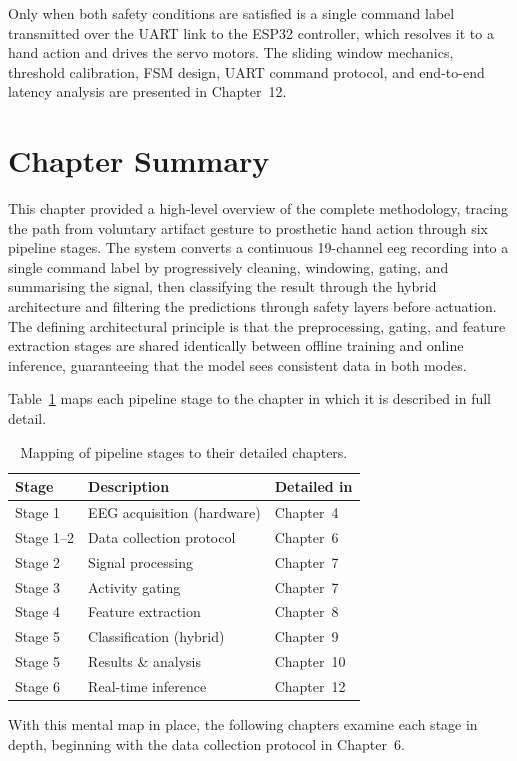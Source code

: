 Only when both safety conditions are satisfied is a single command
label transmitted over the UART link to the ESP32 controller, which
resolves it to a hand action and drives the servo motors. The sliding
window mechanics, threshold calibration, FSM design, UART command
protocol, and end-to-end latency analysis are presented in
Chapter~12.

\section{Chapter Summary}
\label{sec:mo_summary}

This chapter provided a high-level overview of the complete
methodology, tracing the path from voluntary artifact gesture to
prosthetic hand action through six pipeline stages. The system
converts a continuous 19-channel \acrshort{eeg} recording into a
single command label by progressively cleaning, windowing, gating,
and summarising the signal, then classifying the result through the
hybrid architecture and filtering the predictions through safety
layers before actuation. The defining architectural principle is that
the preprocessing, gating, and feature extraction stages are shared
identically between offline training and online inference,
guaranteeing that the model sees consistent data in both modes.

Table~\ref{tab:mo_chapter_map} maps each pipeline stage to the
chapter in which it is described in full detail.

\begin{table}[htbp]
\centering
\caption{Mapping of pipeline stages to their detailed chapters.}
\label{tab:mo_chapter_map}
\renewcommand{\arraystretch}{1.3}
\begin{tabular}{l l l}
\toprule
\textbf{Stage} & \textbf{Description} & \textbf{Detailed in} \\
\midrule
Stage 1    & EEG acquisition (hardware)   & Chapter~4 \\
Stage 1--2 & Data collection protocol     & Chapter~6 \\
Stage 2    & Signal processing            & Chapter~7 \\
Stage 3    & Activity gating              & Chapter~7 \\
Stage 4    & Feature extraction           & Chapter~8 \\
Stage 5    & Classification (hybrid)      & Chapter~9 \\
Stage 5    & Results \& analysis           & Chapter~10 \\
Stage 6    & Real-time inference          & Chapter~12 \\
\bottomrule
\end{tabular}
\end{table}

With this mental map in place, the following chapters examine each
stage in depth, beginning with the data collection protocol in
Chapter~6.